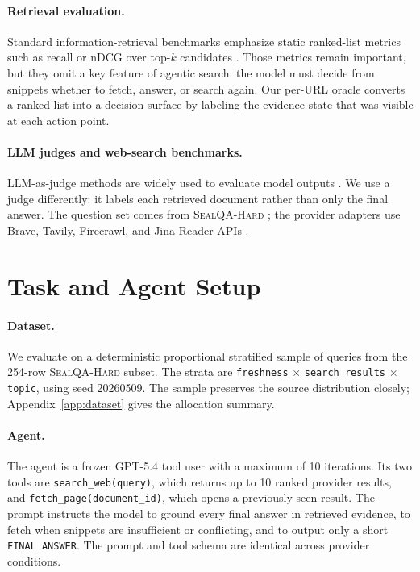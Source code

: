 \documentclass[11pt]{article}
\begin{document}
\paragraph{Retrieval evaluation.}
Standard information-retrieval benchmarks emphasize static ranked-list metrics such as recall or nDCG over top-$k$ candidates \citep{thakur-etal-2021-beir}. Those metrics remain important, but they omit a key feature of agentic search: the model must decide from snippets whether to fetch, answer, or search again. Our per-URL oracle converts a ranked list into a decision surface by labeling the evidence state that was visible at each action point.

\paragraph{LLM judges and web-search benchmarks.}
LLM-as-judge methods are widely used to evaluate model outputs \citep{zheng2023judging}. We use a judge differently: it labels each retrieved document rather than only the final answer. The question set comes from \textsc{SealQA-Hard} \citep{sealqa2025}; the provider adapters use Brave, Tavily, Firecrawl, and Jina Reader APIs \citep{bravesearch-docs,tavily-docs,firecrawl-docs,jina-reader}.

\section{Task and Agent Setup}
\label{sec:setup}

\paragraph{Dataset.} We evaluate on a deterministic proportional stratified sample of \NQueries{} queries from the 254-row \textsc{SealQA-Hard} subset. The strata are \texttt{freshness} $\times$ \texttt{search\_results} $\times$ \texttt{topic}, using seed 20260509. The sample preserves the source distribution closely; Appendix~\ref{app:dataset} gives the allocation summary.

\paragraph{Agent.} The agent is a frozen GPT-5.4 tool user with a maximum of 10 iterations. Its two tools are \texttt{search\_web(query)}, which returns up to 10 ranked provider results, and \texttt{fetch\_page(document\_id)}, which opens a previously seen result. The prompt instructs the model to ground every final answer in retrieved evidence, to fetch when snippets are insufficient or conflicting, and to output only a short \texttt{FINAL ANSWER}. The prompt and tool schema are identical across provider conditions.
\end{document}
